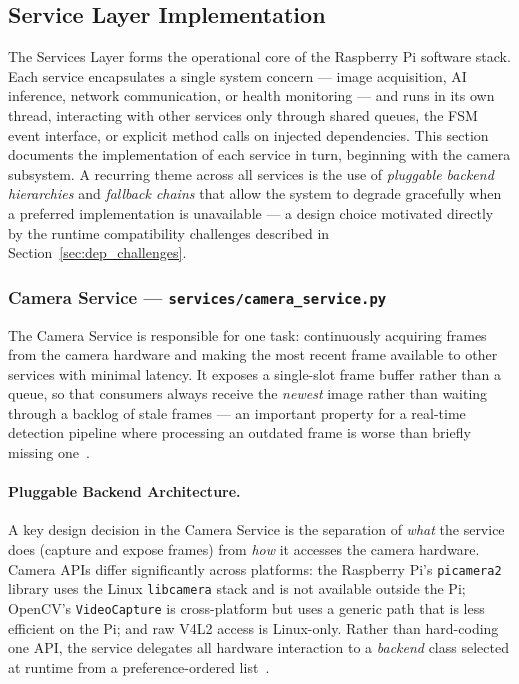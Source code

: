 \subsection{Service Layer Implementation}
\label{sec:service_layer}
 
The Services Layer forms the operational core of the Raspberry Pi
software stack. Each service encapsulates a single system concern —
image acquisition, AI inference, network communication, or health
monitoring — and runs in its own thread, interacting with other
services only through shared queues, the FSM event interface, or
explicit method calls on injected dependencies. This section documents
the implementation of each service in turn, beginning with the camera
subsystem. A recurring theme across all services is the use of
\emph{pluggable backend hierarchies} and \emph{fallback chains} that
allow the system to degrade gracefully when a preferred implementation
is unavailable — a design choice motivated directly by the runtime
compatibility challenges described in Section~\ref{sec:dep_challenges}.
 
\subsubsection{Camera Service — \texttt{services/camera\_service.py}}
\label{sec:camera_service}
 
The Camera Service is responsible for one task: continuously acquiring
frames from the camera hardware and making the most recent frame
available to other services with minimal latency. It exposes a
single-slot frame buffer rather than a queue, so that consumers always
receive the \emph{newest} image rather than waiting through a backlog
of stale frames — an important property for a real-time detection
pipeline where processing an outdated frame is worse than briefly
missing one~\cite{kopetz2011real}.
 
\paragraph{Pluggable Backend Architecture.}
 
A key design decision in the Camera Service is the separation of
\emph{what} the service does (capture and expose frames) from
\emph{how} it accesses the camera hardware. Camera APIs differ
significantly across platforms: the Raspberry Pi's \texttt{picamera2}
library uses the Linux \texttt{libcamera} stack and is not available
outside the Pi; OpenCV's \texttt{VideoCapture} is cross-platform but
uses a generic path that is less efficient on the Pi; and raw V4L2
access is Linux-only. Rather than hard-coding one API, the service
delegates all hardware interaction to a \emph{backend} class selected
at runtime from a preference-ordered list~\cite{gamma1994design}.
 
